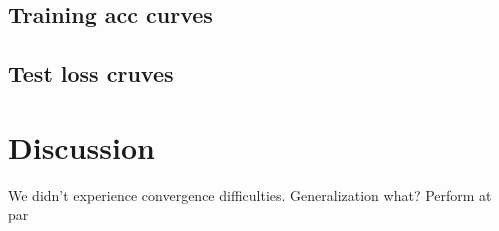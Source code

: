 \subsection{Training acc curves}
\subsection{Test loss cruves}
\section{Discussion}
We didn't experience convergence difficulties.
Generalization what?
Perform at par


